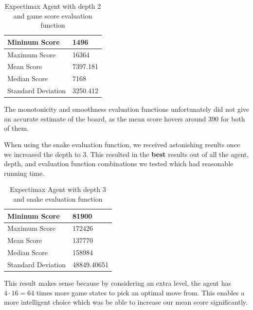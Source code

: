 \documentclass[9pt,twocolumn]{article}
\begin{document}
\begin{table}[!htbp]

\centering

\begin{tabular}{|l|l|}
\hline
Mininum Score      & 1496 \\ \hline
Maximum Score      & 16364 \\ \hline
Mean Score         & 7397.181 \\ \hline
Median Score       & 7168 \\ \hline
Standard Deviation & 3250.412 \\ \hline
\end{tabular}

\caption{Expectimax Agent with depth 2 and game score evaluation function}

\end{table}

The monotonicity and smoothness evaluation functions unfortunately did not give an accurate estimate of the board, as the mean score hovers around 390 for both of them.

When using the snake evaluation function, we received astonishing results once we increased the depth to 3. This resulted in the \textbf{best} results out of all the agent, depth, and evaluation function combinations we tested which had reasonable running time.

\begin{table}[!htbp]

\centering

\begin{tabular}{|l|l|}
\hline
Mininum Score      & 81900 \\ \hline
Maximum Score      & 172426 \\ \hline
Mean Score         & 137770 \\ \hline
Median Score       & 158984 \\ \hline
Standard Deviation & 48849.40651 \\ \hline
\end{tabular}

\caption{Expectimax Agent with depth 3 and snake evaluation function}

\end{table}

This result makes sense because by considering an extra level, the agent has $4 \cdot 16 = 64$ times more game states to pick an optimal move from. This enables a more intelligent choice which was be able to increase our mean score significantly.
\end{document}
